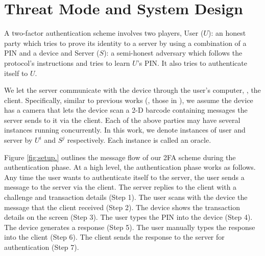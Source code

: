 


\section{Threat Mode and System Design}\label{sec::model}

A two-factor authentication scheme involves two players,
%
%
%
%
 {User ($U$)}: an honest party which tries to prove its identity to a server by using a combination of a PIN and a device and {Server ($S$)}:  a semi-honest adversary which follows the protocol's instructions and tries to learn $U$'s PIN. It also tries to authenticate itself to $U$.  


We let the server communicate with the device through the user's computer, \ie, the client. Specifically, similar to previous works (\eg, those in \cite{JareckiJKSS21,Digipass-website,Gemalto}), we assume the device has a camera that lets the device scan a 2-D barcode containing messages the server sends to it via the client. Each of the above parties may have several instances running concurrently. In this work, we denote instances of user and server by  $U^{i}$ and  $S^{j}$ respectively. Each instance is called an oracle.  

Figure \ref{fig:setup.} outlines the message flow of our 2FA scheme during the authentication phase.  At a high level, the authentication phase works as follows. Any time the user wants to authenticate itself to the server, the user sends a message to the server via the client.  The server replies to the client with a challenge and transaction details (Step 1). The user scans with the device the message that the client received  (Step 2). The device shows the transaction details on the screen (Step 3). The user types the PIN into the device (Step 4). The device generates a response (Step 5). The user manually types the response into the client (Step 6).  The client sends the response to the server for authentication (Step 7). 


